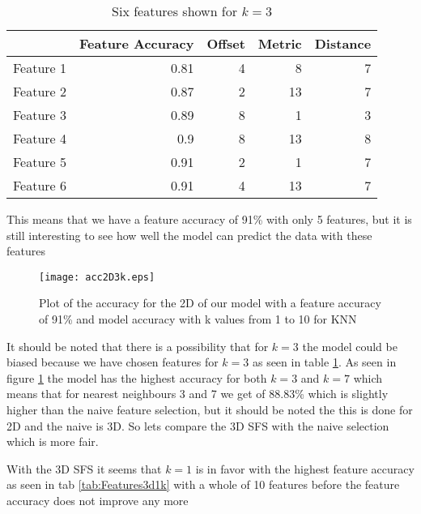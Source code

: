 \begin{table}[htbp]
  \centering
    \begin{tabular}{|r|r|r|r|r|}
    \hline
          & Feature Accuracy & Offset & Metric & Distance \\
    \hline
    Feature 1 & 0.81  & 4     & 8     & 7 \\
    \hline
    Feature 2 & 0.87  & 2     & 13    & 7 \\
    \hline
    Feature 3 & 0.89  & 8     & 1     & 3 \\
    \hline
    Feature 4 & 0.9   & 8     & 13    & 8 \\
    \hline
    Feature 5 & 0.91  & 2     & 1     & 7 \\
    \hline
    Feature 6 & 0.91  & 4     & 13    & 7 \\
    \hline
    \end{tabular}%
    \caption{Six features shown for $k=3$}\label{tab:Features2d3k}%
\end{table}%

This means that we have a feature accuracy of 91\% with only 5 features, but it is still interesting to see how well the model can predict the data with these features

\begin{figure}[H]
  \centering
  \texttt{[image: acc2D3k.eps]}
  \caption{Plot of the accuracy for the 2D of our model with a feature accuracy of 91\% and model accuracy with k values from 1 to 10 for KNN}\label{fig:Features2d3k}
\end{figure}

It should be noted that there is a possibility that for $k=3$ the model could be biased because we have chosen features for $k=3$ as seen in table \ref{tab:Features2d3k}. As seen in figure \ref{fig:Features2d3k} the model has the highest accuracy for both $k=3$ and $k=7$ which means that for nearest neighbours 3 and 7 we get of 88.83\% which is slightly higher than the naive feature selection, but it should be noted the this is done for 2D and the naive is 3D. So lets compare the 3D SFS with the naive selection which is more fair.

With the 3D SFS it seems that $k=1$ is in favor with the highest feature accuracy as seen in tab \ref{tab:Features3d1k} with a whole of 10 features before the feature accuracy does not improve any more

